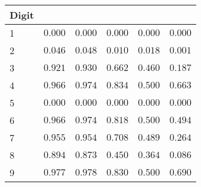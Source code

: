 \begin{table}[!tbp]
\begin{center}
\begin{tabular}{lrrrrr}
\hline\hline
\multicolumn{1}{l}{Digit}&\multicolumn{1}{c}{}&\multicolumn{1}{c}{}&\multicolumn{1}{c}{}&\multicolumn{1}{c}{}&\multicolumn{1}{c}{}\tabularnewline
\hline
1&$0.000$&$0.000$&$0.000$&$0.000$&$0.000$\tabularnewline
2&$0.046$&$0.048$&$0.010$&$0.018$&$0.001$\tabularnewline
3&$0.921$&$0.930$&$0.662$&$0.460$&$0.187$\tabularnewline
4&$0.966$&$0.974$&$0.834$&$0.500$&$0.663$\tabularnewline
5&$0.000$&$0.000$&$0.000$&$0.000$&$0.000$\tabularnewline
6&$0.966$&$0.974$&$0.818$&$0.500$&$0.494$\tabularnewline
7&$0.955$&$0.954$&$0.708$&$0.489$&$0.264$\tabularnewline
8&$0.894$&$0.873$&$0.450$&$0.364$&$0.086$\tabularnewline
9&$0.977$&$0.978$&$0.830$&$0.500$&$0.690$\tabularnewline
\hline
\end{tabular}\end{center}
\end{table}
